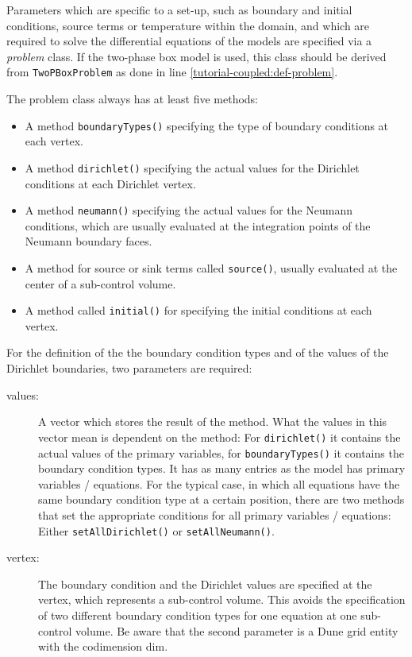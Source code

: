 Parameters which are specific to a set-up, such as boundary and initial
conditions, source terms or temperature within the domain, and which are
required to solve the differential equations of the models are
specified via a \textit{problem} class. If the two-phase box model is
used, this class should be derived from \texttt{TwoPBoxProblem} as done
in line \ref{tutorial-coupled:def-problem}.

The problem class always has at least five methods:
\begin{itemize}
\item A method \texttt{boundaryTypes()} specifying the type of
  boundary conditions at each vertex.
\item A method \texttt{dirichlet()} specifying the actual values for
  the Dirichlet conditions at each Dirichlet vertex.
\item A method \texttt{neumann()} specifying the actual values for
  the Neumann conditions, which are usually evaluated at the 
  integration points of the Neumann boundary faces.
\item A method for source or sink terms called \texttt{source()}, usually evaluated at
  the center of a sub-control volume.
\item A method called \texttt{initial()} for specifying the initial
  conditions at each vertex.
\end{itemize}

For the definition of the the boundary condition types and of the values of the Dirichlet boundaries,
two parameters are required: 
\begin{description}
 \item [values:]  A vector which stores the result of the method. What
  the values in this vector mean is dependent on the method: For
  \texttt{dirichlet()} it contains the actual values of the primary
  variables, for \texttt{boundaryTypes()} it contains the boundary 
  condition types. It has as many entries as the model has primary variables / equations.
  For the typical case, in which all equations have the same boundary
  condition type at a certain position, there are two methods that set the appropriate conditions
  for all primary variables / equations: Either \texttt{setAllDirichlet()} or \texttt{setAllNeumann()}.
 \item [vertex:] The boundary condition and the Dirichlet values are specified at the vertex, which represents a
  sub-control volume. This avoids the specification of two different boundary condition types for one equation at one sub-control volume. 
  Be aware that the second parameter is a Dune grid entity with the codimension dim. 
\end{description}

